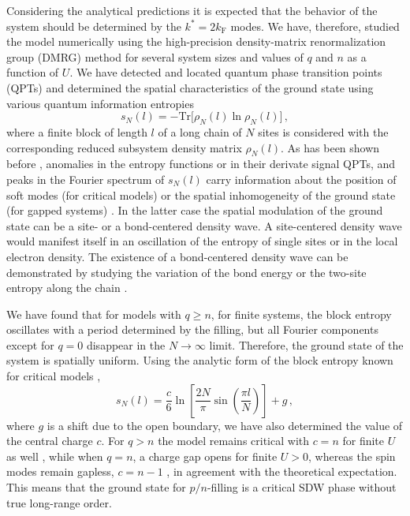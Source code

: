\documentclass[aps,prb,twocolumn,floatfix,showpacs]{revtex4}
\begin{document}
Considering the analytical predictions it is expected that the behavior of the
system should be determined by the $k^* = 2k_{\mathrm{F}}$ modes. We
have, therefore, studied the model numerically using the high-precision
density-matrix renormalization group (DMRG) method \cite{white-dmrg} for
several system sizes and values of $q$ and $n$ as a function of $U$.  We have
detected and located quantum phase transition points (QPTs) and determined the
spatial characteristics of the ground state using various quantum information
entropies \cite{vidal-qpt,legeza-qpt,legeza-incomm}
\begin{equation}
s_N(l) = -{\mathrm{Tr}}\big[ \rho_N(l) \ln \rho_N(l) \big] \,,
\label{eq:neumann}
\end{equation}
where a finite block of length $l$ of a long chain of $N$ sites is considered
with the corresponding reduced subsystem density matrix $\rho_N(l)$.  As has
been shown before \cite{vidal-qpt, legeza-qpt}, anomalies in the entropy
functions or in their derivate signal QPTs, and peaks in the Fourier spectrum
of $s_N(l)$ carry information about the position of soft modes (for critical
models) or the spatial inhomogeneity of the ground state (for gapped systems)
\cite{legeza-incomm}.  In the latter case the spatial modulation of the ground
state can be a site- or a bond-centered density wave. A site-centered density
wave would manifest itself in an oscillation of the entropy of single sites or
in the local electron density.  The existence of a bond-centered density wave
can be demonstrated by studying the variation of the bond energy or the
two-site entropy along the chain \cite{legeza-qpt}.

We have found that for models with $q\ge n$, for finite systems, the block
entropy oscillates with a period determined by the filling, but all Fourier
components except for $q=0$ disappear in the $N \rightarrow \infty$ limit.
Therefore, the ground state of the system is spatially uniform.  Using the
analytic form of the block entropy known for critical models \cite{cardy},
\begin{equation}
s_N(l) = \frac{c}{6}\ln \left[ \frac{2N}{\pi} \sin \left( \frac{\pi l}{N}
\right) \right] + g \,,
\label{eq:cardy}
\end{equation}
where $g$ is a shift due to the open boundary, we have also determined the
value of the central charge $c$.
For $q>n$ the model remains critical with $c=n$ for finite $U$ as well
\cite{LSS}, while when $q=n$, a charge gap opens for finite $U>0$, whereas the
spin modes remain gapless, $c=n-1$ \cite{BLSS}, in agreement with the
theoretical expectation. This means that the ground state for $p/n$-filling is
a critical SDW phase without true long-range order.
\end{document}
